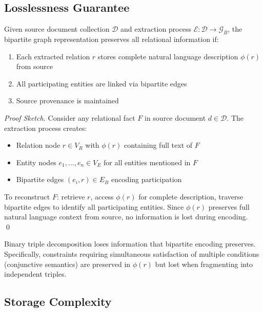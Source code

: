 \documentclass[11pt,a4paper]{article}
\begin{document}
\subsection{Losslessness Guarantee}
\label{sec:lossless}

\begin{theorem}
Given source document collection $\mathcal{D}$ and extraction process $\mathcal{E}: \mathcal{D} \rightarrow \mathcal{G}_B$, the bipartite graph representation preserves all relational information if:
\begin{enumerate}
    \item Each extracted relation $r$ stores complete natural language description $\phi(r)$ from source
    \item All participating entities are linked via bipartite edges
    \item Source provenance is maintained
\end{enumerate}
\end{theorem}

\begin{proof}[Proof Sketch]
Consider any relational fact $F$ in source document $d \in \mathcal{D}$. The extraction process creates:
\begin{itemize}
    \item Relation node $r \in V_R$ with $\phi(r)$ containing full text of $F$
    \item Entity nodes $e_1, \ldots, e_n \in V_E$ for all entities mentioned in $F$
    \item Bipartite edges $(e_i, r) \in E_B$ encoding participation
\end{itemize}

To reconstruct $F$: retrieve $r$, access $\phi(r)$ for complete description, traverse bipartite edges to identify all participating entities. Since $\phi(r)$ preserves full natural language context from source, no information is lost during encoding. \qed
\end{proof}

\begin{corollary}
Binary triple decomposition loses information that bipartite encoding preserves. Specifically, constraints requiring simultaneous satisfaction of multiple conditions (conjunctive semantics) are preserved in $\phi(r)$ but lost when fragmenting into independent triples.
\end{corollary}

\subsection{Storage Complexity}
\end{document}
